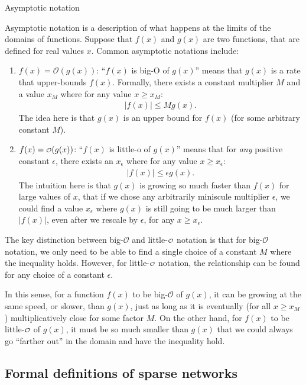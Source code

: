 \begin{floatingbox}[h]\caption{Asymptotic notation}
\label{box:ch7:asy}
Asymptotic notation is a description of what happens at the limits of the domains of functions. Suppose that $f(x)$ and $g(x)$ are two functions, that are defined for real values $x$. Common asymptotic notations include:
\begin{enumerate}
    \item $f(x) = \mathcal O(g(x))$: ``$f(x)$ is big-O of $g(x)$'' means that $g(x)$ is a rate that upper-bounds $f(x)$. Formally, there exists a constant multiplier $M$ and a value $x_M$ where for any value $x \geq x_M$:
    \begin{align*}
        |f(x)| \leq Mg(x).
    \end{align*}
    The idea here is that $g(x)$ is an upper bound for $f(x)$ (for some arbitrary constant $M$).
    \item $f(x) = \smallO(g(x))$: ``$f(x)$ is little-o of $g(x)$'' means that for \textit{any} positive constant $\epsilon$, there exists an $x_\epsilon$ where for any value $x \geq x_\epsilon$:
    \begin{align*}
        |f(x)| \leq \epsilon g(x).
    \end{align*}
    The intuition here is that $g(x)$ is growing so much faster than $f(x)$ for large values of $x$, that if we chose any arbitrarily miniscule multiplier $\epsilon$, we could find a value $x_\epsilon$ where $g(x)$ is still going to be much larger than $|f(x)|$, even after we rescale by $\epsilon$, for any $x \geq x_{\epsilon}$.
\end{enumerate}
The key distinction between big-$\mathcal O$ and little-$\smallO$ notation is that for big-$\mathcal O$ notation, we only need to be able to find a single choice of a constant $M$ where the inequality holds. However, for little-$\smallO$ notation, the relationship can be found for any choice of a constant $\epsilon$. 

In this sense, for a function $f(x)$ to be big-$\mathcal O$ of $g(x)$, it can be growing at the same speed, or slower, than $g(x)$, just as long as it is eventually (for all $x \geq x_M$) multiplicatively close for some factor $M$. On the other hand, for $f(x)$ to be little-$\smallO$ of $g(x)$, it must be so much smaller than $g(x)$ that we could always go ``farther out'' in the domain and have the inequality hold.
\end{floatingbox}

\subsection{Formal definitions of sparse networks}

